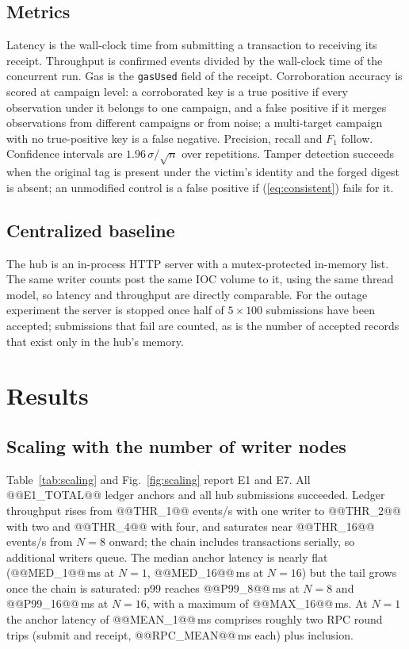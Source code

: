 \documentclass[conference]{IEEEtran}
\begin{document}
\subsection{Metrics}
\label{sec:metrics}
Latency is the wall-clock time from submitting a transaction to receiving its receipt. Throughput is confirmed events divided by the wall-clock time of the concurrent run. Gas is the \texttt{gasUsed} field of the receipt. Corroboration accuracy is scored at campaign level: a corroborated key is a true positive if every observation under it belongs to one campaign, and a false positive if it merges observations from different campaigns or from noise; a multi-target campaign with no true-positive key is a false negative. Precision, recall and $F_1$ follow. Confidence intervals are $1.96\,\sigma/\sqrt{n}$ over repetitions. Tamper detection succeeds when the original tag is present under the victim's identity and the forged digest is absent; an unmodified control is a false positive if (\ref{eq:consistent}) fails for it.

\subsection{Centralized baseline}
The hub is an in-process HTTP server with a mutex-protected in-memory list. The same writer counts post the same IOC volume to it, using the same thread model, so latency and throughput are directly comparable. For the outage experiment the server is stopped once half of $5\times100$ submissions have been accepted; submissions that fail are counted, as is the number of accepted records that exist only in the hub's memory.

\section{Results}
\label{sec:results}

\subsection{Scaling with the number of writer nodes}
\label{sec:res-scale}
Table~\ref{tab:scaling} and Fig.~\ref{fig:scaling} report E1 and E7. All @@E1_TOTAL@@ ledger anchors and all hub submissions succeeded. Ledger throughput rises from @@THR_1@@ events/s with one writer to @@THR_2@@ with two and @@THR_4@@ with four, and saturates near @@THR_16@@ events/s from $N=8$ onward; the chain includes transactions serially, so additional writers queue. The median anchor latency is nearly flat (@@MED_1@@\,ms at $N=1$, @@MED_16@@\,ms at $N=16$) but the tail grows once the chain is saturated: p99 reaches @@P99_8@@\,ms at $N=8$ and @@P99_16@@\,ms at $N=16$, with a maximum of @@MAX_16@@\,ms. At $N=1$ the anchor latency of @@MEAN_1@@\,ms comprises roughly two RPC round trips (submit and receipt, @@RPC_MEAN@@\,ms each) plus inclusion.
\end{document}
